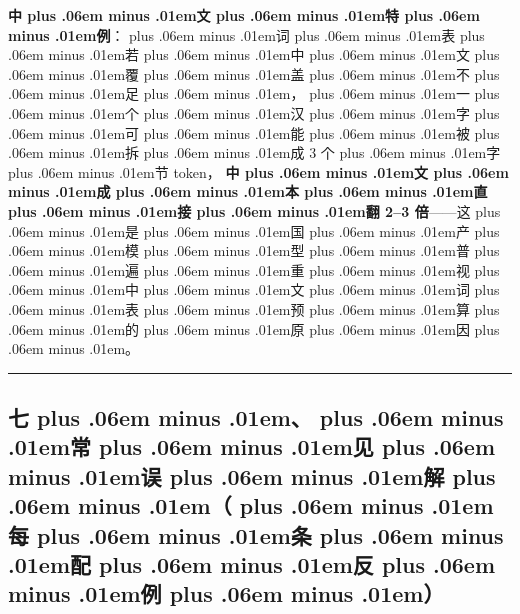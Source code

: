 \documentclass[
]{article}
\def\zh#1{{\zhfont #1}}
\def\zhglue{\hskip0pt plus .06em minus .01em}
\begin{document}
\textbf{\zh{中\zhglue 文\zhglue 特\zhglue 例}}\zh{：\zhglue 词\zhglue 表\zhglue 若\zhglue 中\zhglue 文\zhglue 覆\zhglue 盖\zhglue 不\zhglue 足\zhglue ，\zhglue 一\zhglue 个\zhglue 汉\zhglue 字\zhglue 可\zhglue 能\zhglue 被\zhglue 拆\zhglue 成} 3 \zh{个\zhglue 字\zhglue 节} token\zh{，} \textbf{\zh{中\zhglue 文\zhglue 成\zhglue 本\zhglue 直\zhglue 接\zhglue 翻} 2--3 \zh{倍}}------\zh{这\zhglue 是\zhglue 国\zhglue 产\zhglue 模\zhglue 型\zhglue 普\zhglue 遍\zhglue 重\zhglue 视\zhglue 中\zhglue 文\zhglue 词\zhglue 表\zhglue 预\zhglue 算\zhglue 的\zhglue 原\zhglue 因\zhglue 。}

\begin{center}\rule{0.5\linewidth}{0.5pt}\end{center}

\subsection{\zh{七\zhglue 、\zhglue 常\zhglue 见\zhglue 误\zhglue 解\zhglue （\zhglue 每\zhglue 条\zhglue 配\zhglue 反\zhglue 例\zhglue ）}}\label{ux4e03ux5e38ux89c1ux8befux89e3ux6bcfux6761ux914dux53cdux4f8b}
\end{document}
